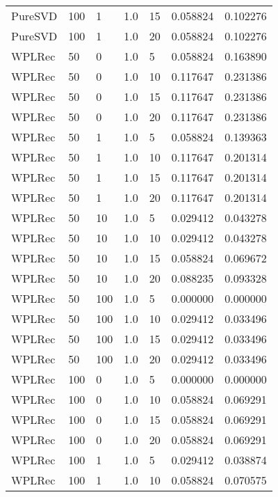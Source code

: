 \begin{tabular}{lllrlrr}
   PureSVD &  100 &     1 &   1.0 &   15 &     0.058824 &  0.102276 \\
   PureSVD &  100 &     1 &   1.0 &   20 &     0.058824 &  0.102276 \\
    WPLRec &   50 &     0 &   1.0 &    5 &     0.058824 &  0.163890 \\
    WPLRec &   50 &     0 &   1.0 &   10 &     0.117647 &  0.231386 \\
    WPLRec &   50 &     0 &   1.0 &   15 &     0.117647 &  0.231386 \\
    WPLRec &   50 &     0 &   1.0 &   20 &     0.117647 &  0.231386 \\
    WPLRec &   50 &     1 &   1.0 &    5 &     0.058824 &  0.139363 \\
    WPLRec &   50 &     1 &   1.0 &   10 &     0.117647 &  0.201314 \\
    WPLRec &   50 &     1 &   1.0 &   15 &     0.117647 &  0.201314 \\
    WPLRec &   50 &     1 &   1.0 &   20 &     0.117647 &  0.201314 \\
    WPLRec &   50 &    10 &   1.0 &    5 &     0.029412 &  0.043278 \\
    WPLRec &   50 &    10 &   1.0 &   10 &     0.029412 &  0.043278 \\
    WPLRec &   50 &    10 &   1.0 &   15 &     0.058824 &  0.069672 \\
    WPLRec &   50 &    10 &   1.0 &   20 &     0.088235 &  0.093328 \\
    WPLRec &   50 &   100 &   1.0 &    5 &     0.000000 &  0.000000 \\
    WPLRec &   50 &   100 &   1.0 &   10 &     0.029412 &  0.033496 \\
    WPLRec &   50 &   100 &   1.0 &   15 &     0.029412 &  0.033496 \\
    WPLRec &   50 &   100 &   1.0 &   20 &     0.029412 &  0.033496 \\
    WPLRec &  100 &     0 &   1.0 &    5 &     0.000000 &  0.000000 \\
    WPLRec &  100 &     0 &   1.0 &   10 &     0.058824 &  0.069291 \\
    WPLRec &  100 &     0 &   1.0 &   15 &     0.058824 &  0.069291 \\
    WPLRec &  100 &     0 &   1.0 &   20 &     0.058824 &  0.069291 \\
    WPLRec &  100 &     1 &   1.0 &    5 &     0.029412 &  0.038874 \\
    WPLRec &  100 &     1 &   1.0 &   10 &     0.058824 &  0.070575 \\

\end{tabular}
